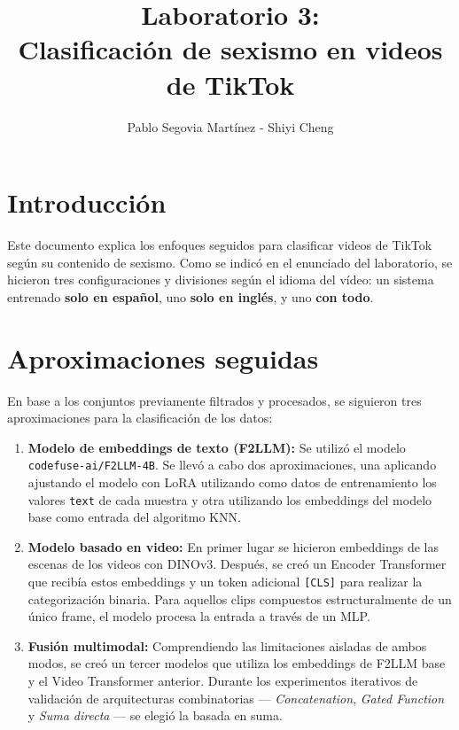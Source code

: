 \documentclass[11pt,a4paper]{article}
\title{\vspace{-2cm}\textbf{Laboratorio 3: \\ Clasificación de sexismo en videos de TikTok}}
\author{Pablo Segovia Martínez - Shiyi Cheng}
\date{\vspace{-5ex}}
\begin{document}
\maketitle
\thispagestyle{empty}

\section*{Introducción}
Este documento explica los enfoques seguidos para clasificar videos de TikTok según su contenido de sexismo. Como se indicó en el enunciado del laboratorio, se hicieron tres configuraciones y divisiones según el idioma del vídeo: un sistema entrenado \textbf{solo en español}, uno \textbf{solo en inglés}, y uno \textbf{con todo}.

\section*{Aproximaciones seguidas}
En base a los conjuntos previamente filtrados y procesados, se siguieron tres aproximaciones para la clasificación de los datos:

\begin{enumerate}
    \item \textbf{Modelo de embeddings de texto (F2LLM):} Se utilizó el modelo \texttt{codefuse-ai/F2LLM-4B}. Se llevó a cabo dos aproximaciones, una aplicando ajustando el modelo con LoRA utilizando como datos de entrenamiento los valores \texttt{text} de cada muestra y otra utilizando los embeddings del modelo base como entrada del algoritmo KNN.
    
    \item \textbf{Modelo basado en video:} En primer lugar se hicieron embeddings de las escenas de los videos con DINOv3. Después, se creó un Encoder Transformer que recibía estos embeddings y un token adicional \texttt{[CLS]} para realizar la categorización binaria. Para aquellos clips compuestos estructuralmente de un único frame, el modelo procesa la entrada a través de un MLP.
    
    \item \textbf{Fusión multimodal:} Comprendiendo las limitaciones aisladas de ambos modos, se creó un tercer modelos que utiliza los embeddings de F2LLM base y el Video Transformer anterior. Durante los experimentos iterativos de validación de arquitecturas combinatorias --- \emph{Concatenation}, \emph{Gated Function} y \emph{Suma directa} --- se elegió la basada en suma.
    
\end{enumerate}
\end{document}
